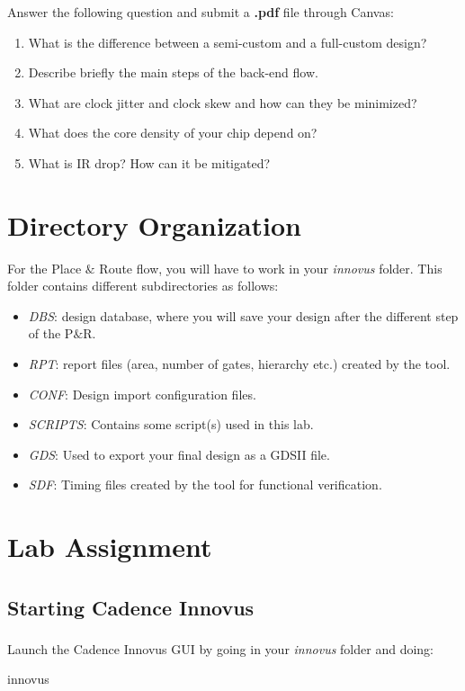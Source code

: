 \begin{prelab}
	Answer the following question and submit a \textbf{.pdf} file through Canvas:
	\begin{enumerate}
	\item What is the difference between a semi-custom and a full-custom design?
	\item Describe briefly the main steps of the back-end flow.
	\item What are clock jitter and clock skew and how can they be minimized?
	\item What does the core density of your chip depend on?
	\item What is IR drop? How can it be mitigated?
	\end{enumerate}
	\vspace{-5mm}
\end{prelab}


\section{Directory Organization}
For the Place $\&$ Route flow, you will have to work in your \textit{innovus} folder. This folder contains different subdirectories as follows:
 \begin{itemize}
\item \textit{DBS}: design database, where you will save your design after the different step of the P$\&$R.
\item \textit{RPT}: report files (area, number of gates, hierarchy etc.) created by the tool.
\item \textit{CONF}: Design import configuration files.
\item \textit{SCRIPTS}: Contains some script(s) used in this lab.
\item \textit{GDS}: Used to export your final design as a GDSII file.
\item \textit{SDF}: Timing files created by the tool for functional verification.
\end{itemize}

\section{Lab Assignment}
\subsection{Starting Cadence Innovus\textsuperscript{\tiny\textregistered}}
Launch the Cadence Innovus\textsuperscript{\tiny\textregistered} GUI by going in your \textit{innovus
} folder and doing:
	\begin{codeline}
	innovus
\end{codeline}



